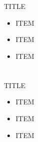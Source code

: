 \documentclass[14pt,dvipdfmx]{beamer}
\begin{document}
\section[]{}
\begin{frame}[containsverbatim,c]{%
TITLE}
\begin{center}
\footnotesize
{\setlength{\leftmargini}{12pt}
\setlength{\leftmarginii}{16pt}
\begin{itemize}
 \item
ITEM
 \item
ITEM
 \item
ITEM
\end{itemize}}
\end{center}
\end{frame}

\section[]{}
\begin{frame}[containsverbatim,c]{%
TITLE}
\begin{center}
\footnotesize
{\setlength{\leftmargini}{12pt}
\setlength{\leftmarginii}{16pt}
\begin{itemize}
 \item
ITEM
 \item
ITEM
 \item
ITEM
\end{itemize}}
\end{center}
\end{frame}

 
\end{document}
